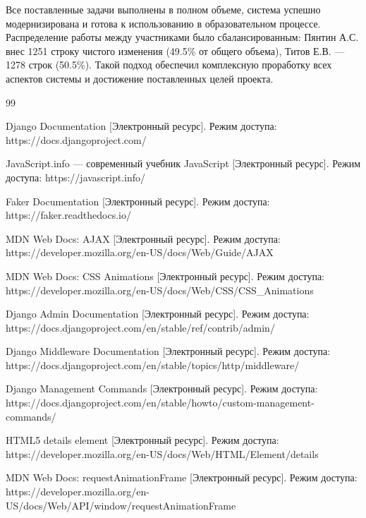 \documentclass[a4paper,12pt]{article}
\begin{document}
Все поставленные задачи выполнены в полном объеме, система успешно модернизирована и готова к использованию в образовательном процессе. Распределение работы между участниками было сбалансированным: Пянтин А.С. внес 1251 строку чистого изменения (49.5\% от общего объема), Титов Е.В. — 1278 строк (50.5\%). Такой подход обеспечил комплексную проработку всех аспектов системы и достижение поставленных целей проекта.

\newpage
\renewcommand{\refname}{Библиографический список использованной литературы}
\begin{thebibliography}{99}
\vspace{5mm}

Django Documentation [Электронный ресурс]. Режим доступа:
https://docs.djangoproject.com/

JavaScript.info --- современный учебник JavaScript [Электронный ресурс]. Режим доступа:
https://javascript.info/

Faker Documentation [Электронный ресурс]. Режим доступа:
https://faker.readthedocs.io/

MDN Web Docs: AJAX [Электронный ресурс]. Режим доступа:
https://developer.mozilla.org/en-US/docs/Web/Guide/AJAX

MDN Web Docs: CSS Animations [Электронный ресурс]. Режим доступа:
https://developer.mozilla.org/en-US/docs/Web/CSS/CSS\_Animations

Django Admin Documentation [Электронный ресурс]. Режим доступа:
https://docs.djangoproject.com/en/stable/ref/contrib/admin/

Django Middleware Documentation [Электронный ресурс]. Режим доступа:
https://docs.djangoproject.com/en/stable/topics/http/middleware/

Django Management Commands [Электронный ресурс]. Режим доступа:
https://docs.djangoproject.com/en/stable/howto/custom-management-commands/

HTML5 details element [Электронный ресурс]. Режим доступа:
https://developer.mozilla.org/en-US/docs/Web/HTML/Element/details

MDN Web Docs: requestAnimationFrame [Электронный ресурс]. Режим доступа:
https://developer.mozilla.org/en-US/docs/Web/API/window/requestAnimationFrame

\end{thebibliography}
\end{document}
